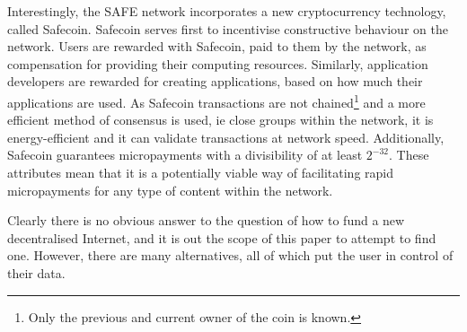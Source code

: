 \documentclass[twocolumn,english]{article}
\begin{document}
Interestingly, the SAFE network incorporates a new cryptocurrency technology, called Safecoin.  Safecoin serves first to incentivise constructive behaviour on the network. Users are rewarded with Safecoin, paid to them by the network, as compensation for providing their computing resources. Similarly, application developers are rewarded for creating applications, based on how much their applications are used. As Safecoin transactions are not chained\footnote{Only the previous and current owner of the coin is known.} and a more efficient method of consensus is used, ie close groups within the network, it is energy-efficient and it can validate transactions at network speed. Additionally, Safecoin guarantees micropayments with a divisibility of at least $2^{-32}$. These attributes mean that it is a potentially viable way of facilitating rapid micropayments for any type of content within the network.

Clearly there is no obvious answer to the question of how to fund a new decentralised Internet, and it is out the scope of this paper to attempt to find one. However, there are many alternatives, all of which put the user in control of their data.

%
%
\end{document}
